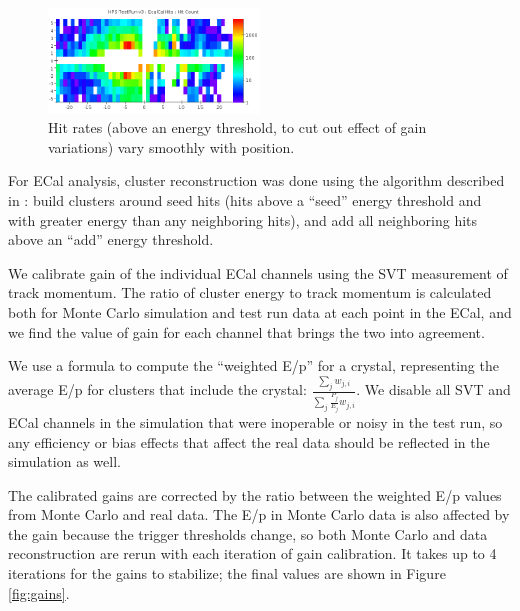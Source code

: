 \begin{figure}[ht]
	\includegraphics[width=0.5\textwidth]{test2012/ecalperformance/hitrates}
	\caption{\small{Hit rates (above an energy threshold, to cut out effect of gain variations) vary smoothly with position.}}
	\label{fig:hitrates}
\end{figure}

For ECal analysis, cluster reconstruction was done using the algorithm described in \cite{HPS_PROP}: build clusters around seed hits (hits above a ``seed'' energy threshold and with greater energy than any neighboring hits), and add all neighboring hits above an ``add'' energy threshold.

\vspace{1cm}{\bf ECal Calibration [Sho]}

We calibrate gain of the individual ECal channels using the SVT measurement of track momentum. 
The ratio of cluster energy to track momentum is calculated both for Monte Carlo simulation and test run data at each point in the ECal, and we find the value of gain for each channel that brings the two into agreement.

We use a formula to compute the ``weighted E/p'' for a crystal, representing the average E/p for clusters that include the crystal: $\frac{\sum_j w_{j,i}}{\sum_j\frac{P_j}{E_j}w_{j,i}}$.
We disable all SVT and ECal channels in the simulation that were inoperable or noisy in the test run, so any efficiency or bias effects that affect the real data should be reflected in the simulation as well.

The calibrated gains are corrected by the ratio between the weighted E/p values from Monte Carlo and real data.
The E/p in Monte Carlo data is also affected by the gain because the trigger thresholds change, so both Monte Carlo and data reconstruction are rerun with each iteration of gain calibration.
It takes up to 4 iterations for the gains to stabilize; the final values are shown in Figure \ref{fig:gains}.

